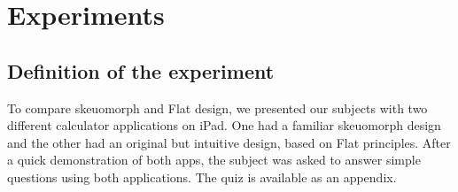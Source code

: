 \documentclass[a4paper,11pt] {article}
\theoremstyle{definition}
\begin{document}
\section{Experiments}
\label{sct:experiment}

    \subsection{Definition of the experiment}

    To compare skeuomorph and Flat design, we presented our subjects with two different calculator applications on iPad. One had a familiar skeuomorph design and the other had an original but intuitive design, based on Flat principles. After a quick demonstration of both apps, the subject was asked to answer simple questions using both applications. The quiz is available as an appendix.\\
 \begin{figure}[H]
    \centering
    \
    \end{figure}
\end{document}
